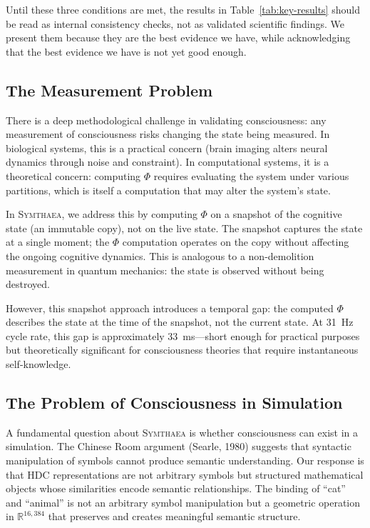 \documentclass[12pt]{book}
\newcommand{\symthaea}{\textsc{Symthaea}}
\newcommand{\R}{\mathbb{R}}
\begin{document}
Until these three conditions are met, the results in Table~\ref{tab:key-results} should be read as internal consistency checks, not as validated scientific findings. We present them because they are the best evidence we have, while acknowledging that the best evidence we have is not yet good enough.

\subsection{The Measurement Problem}

There is a deep methodological challenge in validating consciousness: any measurement of consciousness risks changing the state being measured. In biological systems, this is a practical concern (brain imaging alters neural dynamics through noise and constraint). In computational systems, it is a theoretical concern: computing $\Phi$ requires evaluating the system under various partitions, which is itself a computation that may alter the system's state.

In \symthaea{}, we address this by computing $\Phi$ on a snapshot of the cognitive state (an immutable copy), not on the live state. The snapshot captures the state at a single moment; the $\Phi$ computation operates on the copy without affecting the ongoing cognitive dynamics. This is analogous to a non-demolition measurement in quantum mechanics: the state is observed without being destroyed.

However, this snapshot approach introduces a temporal gap: the computed $\Phi$ describes the state at the time of the snapshot, not the current state. At 31~Hz cycle rate, this gap is approximately 33~ms---short enough for practical purposes but theoretically significant for consciousness theories that require instantaneous self-knowledge.

\subsection{The Problem of Consciousness in Simulation}

A fundamental question about \symthaea{} is whether consciousness can exist in a simulation. The Chinese Room argument (Searle, 1980) suggests that syntactic manipulation of symbols cannot produce semantic understanding. Our response is that HDC representations are not arbitrary symbols but structured mathematical objects whose similarities encode semantic relationships. The binding of ``cat'' and ``animal'' is not an arbitrary symbol manipulation but a geometric operation in $\R^{16{,}384}$ that preserves and creates meaningful semantic structure.
\end{document}
